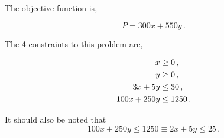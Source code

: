%
%
\usetikzlibrary{patterns}

\begin{subquestions}
	

\subquestion

The objective function is,

\begin{equation}
	P = 300x + 550y \,.
\end{equation}


\subquestion

The 4 constraints to this problem are, 

\begin{align}
	x & \geq 0 \,, \nonumber \\
	y & \geq 0 \,, \nonumber \\
	3x + 5y & \leq 30 \,, \nonumber \\
	100x + 250y & \leq 1250 \,.
\end{align}

It should also be noted that
\begin{equation}
	100x + 250y \leq 1250 \equiv 2x + 5y \leq 25 \,.
\end{equation}


\subquestion


\end{subquestions}
